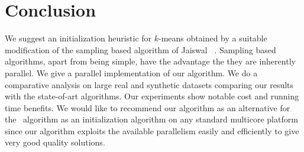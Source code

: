 \section{Conclusion}
We suggest an initialization heuristic for $k$-means obtained by a suitable modification of  the sampling based algorithm of Jaiswal \etal~\cite{jks}.
Sampling based algorithms, apart from being simple, have the advantage the they are inherently parallel.
We give a parallel implementation of our algorithm.
We do a comparative analysis on large real and synthetic datasets comparing our results with the state-of-art algorithms.
Our experiments show notable cost and running time benefits.
We would like to recommend our algorithm as an alternative for the \kmpp\ algorithm as an initialization algorithm on any standard multicore platform since our algorithm exploits the available parallelism easily and efficiently to give very good quality solutions.